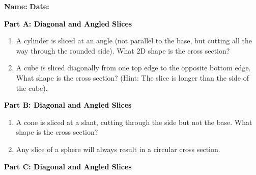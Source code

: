 \documentclass[12pt, letterpaper, fleqn]{article}
\begin{document}
\textbf{Name:} \underline{\hspace{5cm}}
\hfill
\textbf{Date:} \underline{\hspace{3cm}}\\

\begin{tcolorbox}[colback=customteal!20]
\large\textcolor{black}{\textbf{Part A: Diagonal and Angled Slices}}
\end{tcolorbox}

\vspace{3mm}

\begin{enumerate}[itemsep=5.5cm, leftmargin=0.6cm]
\item A cylinder is sliced at an angle (not parallel to the base, but cutting all the way through the rounded side). What 2D shape is the cross section?
\item A cube is sliced diagonally from one top edge to the opposite bottom edge. What shape is the cross section? (Hint: The slice is longer than the side of the cube).
\end{enumerate}

\newpage

\begin{tcolorbox}[colback=customteal!20]
\large\textcolor{black}{\textbf{Part B: Diagonal and Angled Slices}}
\end{tcolorbox}

\vspace{3mm}

\begin{enumerate}[itemsep=5.5cm, leftmargin=0.6cm, resume]
\item A cone is sliced at a slant, cutting through the side but not the base. What shape is the cross section?
\item Any slice of a sphere will always result in a circular cross section.
\end{enumerate}

\newpage

\begin{tcolorbox}[colback=customteal!20]
\large\textcolor{black}{\textbf{Part C: Diagonal and Angled Slices}}
\end{tcolorbox}

\vspace{3mm}
\end{document}
